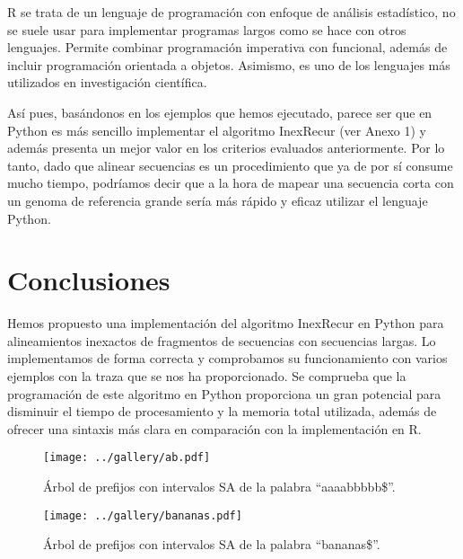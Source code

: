 \documentclass{article}
\begin{document}
R se trata de un lenguaje de  programación  con  enfoque  de  análisis
estadístico, no se suele usar para implementar programas  largos  como
se hace con otros lenguajes.  Permite combinar programación imperativa
con funcional, además de incluir  programación	orientada  a  objetos.
Asimismo, es uno de los  lenguajes  más  utilizados  en  investigación
científica. \cite{bellosta_2018,kleiber_zeileis_2008}

Así pues, basándonos en los ejemplos que hemos ejecutado,  parece  ser
que en Python es más sencillo implementar el algoritmo InexRecur  (ver
Anexo 1) y además presenta un mejor valor en los  criterios  evaluados
anteriormente.	Por lo	tanto,	dado  que  alinear  secuencias	es  un
procedimiento que ya de por sí consume mucho tiempo,  podríamos  decir
que a la  hora	de  mapear  una  secuencia  corta  con	un  genoma  de
referencia grande sería más  rápido  y	eficaz	utilizar  el  lenguaje
Python. \cite{amigo_2015}

\section{Conclusiones}

Hemos propuesto una implementación del algoritmo InexRecur  en	Python
para  alineamientos  inexactos	de  fragmentos	 de   secuencias   con
secuencias largas. Lo implementamos de forma correcta y comprobamos su
funcionamiento con  varios  ejemplos  con  la  traza  que  se  nos  ha
proporcionado.	Se comprueba que la programación de este algoritmo  en
Python proporciona un gran  potencial  para  disminuir	el  tiempo  de
procesamiento y la memoria total  utilizada,  además  de  ofrecer  una
sintaxis  más  clara  en  comparación  con  la	implementación	en  R.


\clearpage
\phantom{}
\vfill
\begin{figure}[h!]
\centering
\texttt{[image: ../gallery/ab.pdf]}
\caption{Árbol de prefijos con intervalos SA de la palabra ``aaaabbbbb\$''.}
\label{fig:arbol2}
\end{figure}
\vfill

\clearpage

\phantom{}
\vspace{3cm}
\begin{figure}[h]
\centering
\texttt{[image: ../gallery/bananas.pdf]}
\caption{Árbol de prefijos con intervalos SA de la palabra ``bananas\$''.}
\label{fig:arbol3}
\end{figure}
\end{document}
